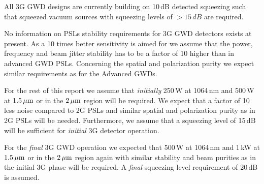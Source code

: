 All 3G GWD designs are currently building on 10\,dB detected squeezing such that squeezed vacuum sources with squeezing levels of $> 15\,dB$ are required. 

No information on PSLs stability requirements for 3G GWD detectors exists at present. As a 10 times better sensitivity is aimed for we assume that the power, frequency and beam jitter stability has to be a factor of 10 higher than in advanced GWD PSLs. Concerning the spatial and polarization purity we expect similar requirements as for the Advanced GWDs.

For the rest of this report we assume that \emph{initially} 250\,W at 1064\,nm and 500\,W at  $ 1.5\, {\rm \mu m}$ or in the $ 2\, {\rm \mu m}$ region will be required. We expect that a factor of 10 less noise compared to 2G PSLs and similar spatial and polarization purity as in 2G PSLs will be needed. Furthermore, we assume that a squeezing level of 15\,dB will be sufficient for \emph{initial} 3G detector operation.

For the \emph{final} 3G GWD operation we expected that  500\,W at 1064\,nm and 1\,kW at  $ 1.5\, {\rm \mu m}$ or in the $ 2\, {\rm \mu m}$ region again with similar stability and beam purities as in the initial 3G phase will be required. A \emph{final} squeezing level requirement of 20\,dB is assumed.

%


